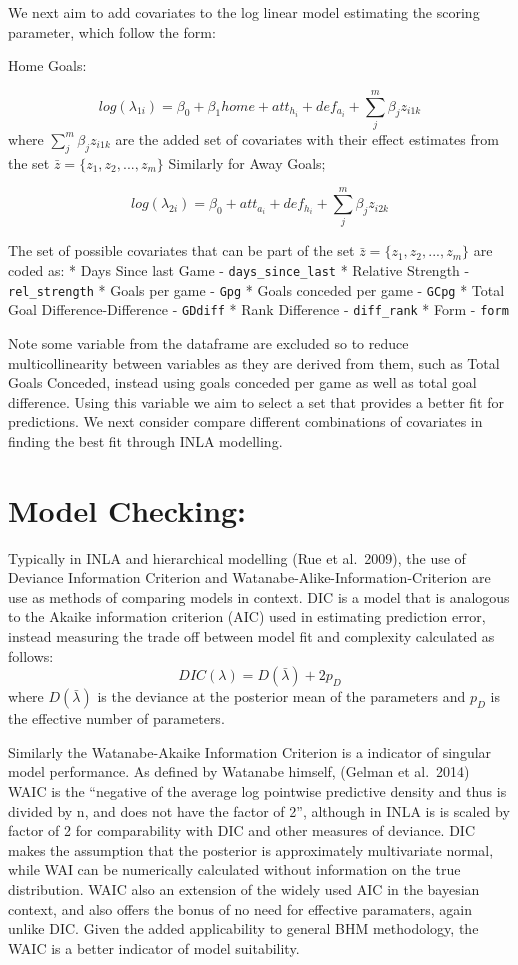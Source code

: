 \documentclass[
]{article}
\begin{document}
We next aim to add covariates to the log linear model estimating the
scoring parameter, which follow the form:

Home Goals:

\[log(\lambda_{1i}) = \beta_0 + \beta_1 home + att_{h_i} + def_{a_i} + \sum^m_j\beta_jz_{i1k}\]
where \(\sum^m_j\beta_jz_{i1k}\) are the added set of covariates with
their effect estimates from the set \(\bar{z}= \{ {z_1,z_2,...,z_m} \}\)
Similarly for Away Goals;

\[log(\lambda_{2i}) = \beta_0 + att_{a_i} + def_{h_i} + \sum^m_j\beta_jz_{i2k}\]

The set of possible covariates that can be part of the set
\(\bar{z}= \{ {z_1,z_2,...,z_m} \}\) are coded as: * Days Since last
Game - \texttt{days\_since\_last} * Relative Strength -
\texttt{rel\_strength} * Goals per game - \texttt{Gpg} * Goals conceded
per game - \texttt{GCpg} * Total Goal Difference-Difference -
\texttt{GDdiff} * Rank Difference - \texttt{diff\_rank} * Form -
\texttt{form}

Note some variable from the dataframe are excluded so to reduce
multicollinearity between variables as they are derived from them, such
as Total Goals Conceded, instead using goals conceded per game as well
as total goal difference. Using this variable we aim to select a set
that provides a better fit for predictions. We next consider compare
different combinations of covariates in finding the best fit through
INLA modelling.

\hypertarget{model-checking}{%
\section{Model Checking:}\label{model-checking}}

Typically in INLA and hierarchical modelling (Rue et al.~2009), the use
of Deviance Information Criterion and
Watanabe-Alike-Information-Criterion are use as methods of comparing
models in context. DIC is a model that is analogous to the Akaike
information criterion (AIC) used in estimating prediction error, instead
measuring the trade off between model fit and complexity calculated as
follows: \[ DIC(\lambda) =  D(\bar{\lambda}) + 2p_D \] where
\(D(\bar{\lambda})\) is the deviance at the posterior mean of the
parameters and \(p_D\) is the effective number of parameters.

Similarly the Watanabe-Akaike Information Criterion is a indicator of
singular model performance. As defined by Watanabe himself, (Gelman et
al.~2014) WAIC is the ``negative of the average log pointwise predictive
density and thus is divided by n, and does not have the factor of 2'',
although in INLA is is scaled by factor of 2 for comparability with DIC
and other measures of deviance. DIC makes the assumption that the
posterior is approximately multivariate normal, while WAI can be
numerically calculated without information on the true distribution.
WAIC also an extension of the widely used AIC in the bayesian context,
and also offers the bonus of no need for effective paramaters, again
unlike DIC. Given the added applicability to general BHM methodology,
the WAIC is a better indicator of model suitability.
\end{document}
